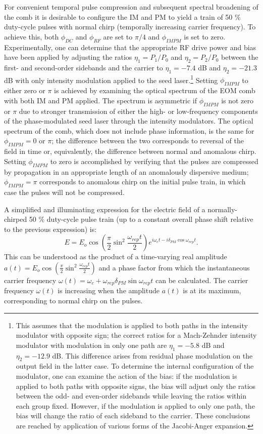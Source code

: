 For convenient temporal pulse compression and subsequent spectral broadening of the comb it is desirable to configure the IM and PM to yield a train of 50 $\%$ duty-cycle pulses with normal chirp (temporally increasing carrier frequency). To achieve this, both $\phi_{DC}$ and $\phi_{RF}$ are set to $\pi/4$ and $\phi_{IMPM}$ is set to zero. Experimentally, one can determine that the appropriate RF drive power and bias have been applied by adjusting the ratios $\eta_1=P_1/P_0$ and $\eta_2=P_2/P_0$ between the first- and second-order sidebands and the carrier to $\eta_1=-7.4$ dB and $\eta_2=-21.3$ dB with only intensity modulation applied to the seed laser.\footnote{This assumes that the modulation is applied to both paths in the intensity modulator with opposite sign; the correct ratios for a Mach-Zehnder intensity modulator with modulation in only one path are $\eta_1=-5.8$ dB and $\eta_2=-12.9$ dB. This difference arises from residual phase modulation on the output field in the latter case. To determine the internal configuration of the modulator, one can examine the action of the bias: if the modulation is applied to both paths with opposite signs, the bias will adjust only the ratios between the odd- and even-order sidebands while leaving the ratios within each group fixed. However, if the modulation is applied to only one path, the bias will change the ratio of each sideband to the carrier. These conclusions are reached by application of various forms of the Jacobi-Anger expansion.} Setting $\phi_{IMPM}$ to either zero or $\pi$ is achieved by examining the optical spectrum of the EOM comb with both IM and PM applied. The spectrum is asymmetric if $\phi_{IMPM}$ is not zero or $\pi$ due to stronger transmission of either the high- or low-frequency components of the phase-modulated seed laser through the intensity modulators. The optical spectrum of the comb, which does not include phase information, is the same for $\phi_{IMPM}=0$ or $\pi$; the difference between the two corresponds to reversal of the field in time or, equivalently, the difference between normal and anomalous chirp. Setting $\phi_{IMPM}$ to zero is accomplished by verifying that the pulses are compressed by propagation in an appropriate length of an anomalously dispersive medium; $\phi_{IMPM}=\pi$ corresponds to anomalous chirp on the initial pulse train, in which case the pulses will not be compressed.

A simplified and illuminating expression for the electric field of a normally-chirped 50 $\%$ duty-cycle pulse train (up to a constant overall phase shift relative to the previous expression) is:
\begin{equation}
E=E_o\cos\left(\frac{\pi}{2}\sin^2{\frac{\omega_{rep}t}{2}}\right)e^{i\omega_ct-i\delta_{PM}\cos{\omega_{rep}t}}. \label{eq:EOMC}
\end{equation}
This can be understood as the product of a time-varying real amplitude $a(t)=E_o\cos\left(\frac{\pi}{2}\sin^2{\frac{\omega_{rep}t}{2}}\right)$ and a phase factor from which the instantaneous carrier frequency $\omega(t)=\omega_c+\omega_{rep}\delta_{PM}\sin{\omega_{rep}t}$ can be calculated. The carrier frequency $\omega(t)$ is increasing when the amplitude $a(t)$ is at its maximum, corresponding to normal chirp on the pulses.



